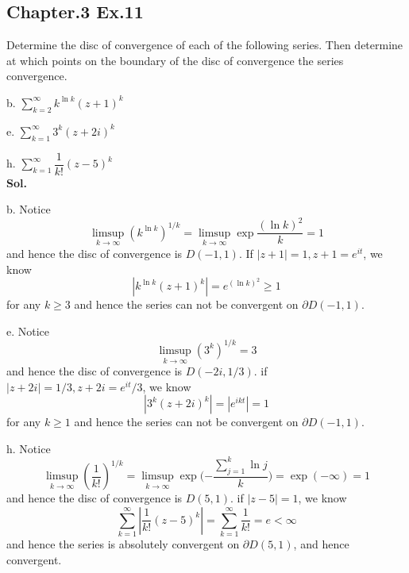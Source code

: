 \documentclass[lang=en,11pt,a4paper,citestyle =authoryear]{elegantpaper}
\begin{document}
\subsection*{Chapter.3 Ex.11} 
Determine the disc of convergence of each of the following series. Then determine at which points on the boundary of the disc of convergence the series convergence.\par
b. $\sum_{k=2}^{\infty}k^{\ln k}(z+1)^k$\par
e. $\sum_{k=1}^{\infty} 3^k(z+2i)^k$\par
h. $\sum_{k=1}^{\infty} \dfrac{1}{k!}(z-5)^k$
\vspace{0.5em}\\
\textbf{Sol.} \par
b. Notice
\[
\limsup_{k\to\infty} (k^{\ln k})^{1/k} = \limsup_{k\to\infty} \exp{\dfrac{(\ln k)^2}{k}} = 1
\]
and hence the disc of convergence is $D(-1,1)$. If $|z+1| = 1, z+1 = e^{it}$, we know
\[
|k^{\ln k}(z+1)^k| = e^{(\ln k)^2} \geq 1
\]
for any $k\geq 3$ and hence the series can not be convergent on $\partial D(-1,1)$.\par
e. Notice
\[
\limsup_{k\to\infty} (3^k)^{1/k} = 3
\]
and hence the disc of convergence is $D(-2i,1/3)$. if $|z+2i| = 1/3, z+2i = e^{it}/3$, we know
\[
|3^k(z+2i)^k| = |e^{ikt}| = 1
\]
for any $k\geq 1$ and hence the series can not be convergent on $\partial D(-1,1)$.\par
h.
Notice
\[
\limsup_{k\to\infty} (\dfrac{1}{k!})^{1/k} = \limsup_{k\to\infty} \exp\Big({-\dfrac{\sum\limits_{j=1}^k \ln j}{k}}\Big) = \exp(-\infty) = 1
\]
and hence the disc of convergence is $D(5,1)$. if $|z-5| = 1$, we know
\[
\sum\limits_{k=1}^{\infty} |\dfrac{1}{k!}(z-5)^k| = \sum\limits_{k=1}^{\infty}\dfrac{1}{k!} = e < \infty
\]
and hence the series is absolutely convergent on $\partial D(5,1)$, and hence convergent.
\par
\vspace{0.5em}
\end{document}
